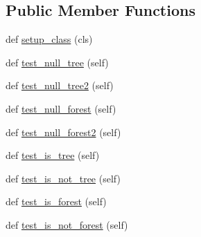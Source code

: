 \subsection*{Public Member Functions}
\begin{DoxyCompactItemize}
\item 
def \hyperlink{classnetworkx_1_1algorithms_1_1tree_1_1tests_1_1test__recognition_1_1TestTreeRecognition_a1639dc0c90a74ed9bfbf697d38ae9251}{setup\+\_\+class} (cls)
\item 
def \hyperlink{classnetworkx_1_1algorithms_1_1tree_1_1tests_1_1test__recognition_1_1TestTreeRecognition_a2fed8e05f5b0cdfd47efdc78bcb7d609}{test\+\_\+null\+\_\+tree} (self)
\item 
def \hyperlink{classnetworkx_1_1algorithms_1_1tree_1_1tests_1_1test__recognition_1_1TestTreeRecognition_a8b29cd92aba577df0acace93541d4742}{test\+\_\+null\+\_\+tree2} (self)
\item 
def \hyperlink{classnetworkx_1_1algorithms_1_1tree_1_1tests_1_1test__recognition_1_1TestTreeRecognition_a7096e48b63e4015cfc8e77226e1dd7ac}{test\+\_\+null\+\_\+forest} (self)
\item 
def \hyperlink{classnetworkx_1_1algorithms_1_1tree_1_1tests_1_1test__recognition_1_1TestTreeRecognition_acda376ead9c342829beaffe08a5c641b}{test\+\_\+null\+\_\+forest2} (self)
\item 
def \hyperlink{classnetworkx_1_1algorithms_1_1tree_1_1tests_1_1test__recognition_1_1TestTreeRecognition_a2aef9afdacb8384797f1464dd3d93fa4}{test\+\_\+is\+\_\+tree} (self)
\item 
def \hyperlink{classnetworkx_1_1algorithms_1_1tree_1_1tests_1_1test__recognition_1_1TestTreeRecognition_ae3fbd5d0db2300eb078e1fbb0d8f2c6e}{test\+\_\+is\+\_\+not\+\_\+tree} (self)
\item 
def \hyperlink{classnetworkx_1_1algorithms_1_1tree_1_1tests_1_1test__recognition_1_1TestTreeRecognition_a8c99e2471a8c36153419e128223b11f4}{test\+\_\+is\+\_\+forest} (self)
\item 
def \hyperlink{classnetworkx_1_1algorithms_1_1tree_1_1tests_1_1test__recognition_1_1TestTreeRecognition_a93ddecc7c42b36fb2d8d9dd4a18d3134}{test\+\_\+is\+\_\+not\+\_\+forest} (self)
\end{DoxyCompactItemize}
